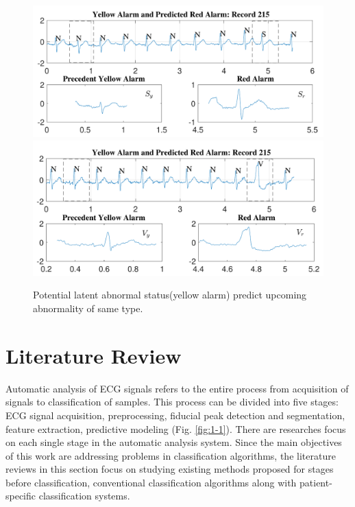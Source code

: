  \begin{figure}[t]
 	\centering
 	\includegraphics[scale=0.6]{Fig/predicting_record215S_croped.pdf}
 	\includegraphics[scale=0.6]{Fig/predicting_record215_croped.pdf} 
 	\caption{Potential latent abnormal status(yellow alarm) predict upcoming abnormality of same type.}
 	\label{fig:pred_signals}
 \end{figure}




\section{Literature Review}
Automatic analysis of ECG signals refers to the entire process from acquisition of signals to classification of samples. This process can be divided into five stages: ECG signal acquisition, preprocessing, fiducial peak detection and segmentation, feature extraction, predictive modeling (Fig. \ref{fig:1-1}). There are researches focus on each single stage in the automatic analysis system. Since the main objectives of this work are addressing problems in classification algorithms, the literature reviews in this section focus on studying existing methods proposed for stages before classification, conventional classification algorithms along with patient-specific classification systems. 

